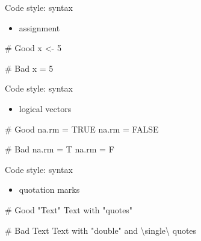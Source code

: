 \documentclass[
  ignorenonframetext,
]{beamer}
\newenvironment{Shaded}{\begin{snugshade}}{\end{snugshade}}
\newcommand{\CommentTok}[1]{\textcolor[rgb]{0.37,0.37,0.37}{#1}}
\newcommand{\ConstantTok}[1]{\textcolor[rgb]{0.56,0.35,0.01}{#1}}
\newcommand{\DecValTok}[1]{\textcolor[rgb]{0.68,0.00,0.00}{#1}}
\newcommand{\NormalTok}[1]{\textcolor[rgb]{0.00,0.23,0.31}{#1}}
\newcommand{\OtherTok}[1]{\textcolor[rgb]{0.00,0.23,0.31}{#1}}
\newcommand{\SpecialCharTok}[1]{\textcolor[rgb]{0.37,0.37,0.37}{#1}}
\newcommand{\StringTok}[1]{\textcolor[rgb]{0.13,0.47,0.30}{#1}}
\providecommand{\tightlist}{%
  \setlength{\itemsep}{0pt}\setlength{\parskip}{0pt}}\usepackage{longtable,booktabs,array}
\begin{document}
\begin{frame}[fragile]{Code style: syntax}
\protect\hypertarget{code-style-syntax-4}{}
\begin{itemize}
\tightlist
\item
  assignment
\end{itemize}

\begin{Shaded}
\begin{Highlighting}[]
\CommentTok{\# Good}
\NormalTok{x }\OtherTok{\textless{}{-}} \DecValTok{5}

\CommentTok{\# Bad}
\NormalTok{x }\OtherTok{=} \DecValTok{5}
\end{Highlighting}
\end{Shaded}
\end{frame}

\begin{frame}[fragile]{Code style: syntax}
\protect\hypertarget{code-style-syntax-5}{}
\begin{itemize}
\tightlist
\item
  logical vectors
\end{itemize}

\begin{Shaded}
\begin{Highlighting}[]
\CommentTok{\# Good}
\NormalTok{na.rm }\OtherTok{=} \ConstantTok{TRUE}
\NormalTok{na.rm }\OtherTok{=} \ConstantTok{FALSE}

\CommentTok{\# Bad}
\NormalTok{na.rm }\OtherTok{=}\NormalTok{ T}
\NormalTok{na.rm }\OtherTok{=}\NormalTok{ F}
\end{Highlighting}
\end{Shaded}
\end{frame}

\begin{frame}[fragile]{Code style: syntax}
\protect\hypertarget{code-style-syntax-6}{}
\begin{itemize}
\tightlist
\item
  quotation marks
\end{itemize}

\begin{Shaded}
\begin{Highlighting}[]
\CommentTok{\# Good}
\StringTok{"Text"}
\StringTok{\textquotesingle{}Text with "quotes"\textquotesingle{}}

\CommentTok{\# Bad}
\StringTok{\textquotesingle{}Text\textquotesingle{}}
\StringTok{\textquotesingle{}Text with "double" and }\SpecialCharTok{\textbackslash{}\textquotesingle{}}\StringTok{single}\SpecialCharTok{\textbackslash{}\textquotesingle{}}\StringTok{ quotes\textquotesingle{}}
\end{Highlighting}
\end{Shaded}
\end{frame}
\end{document}
